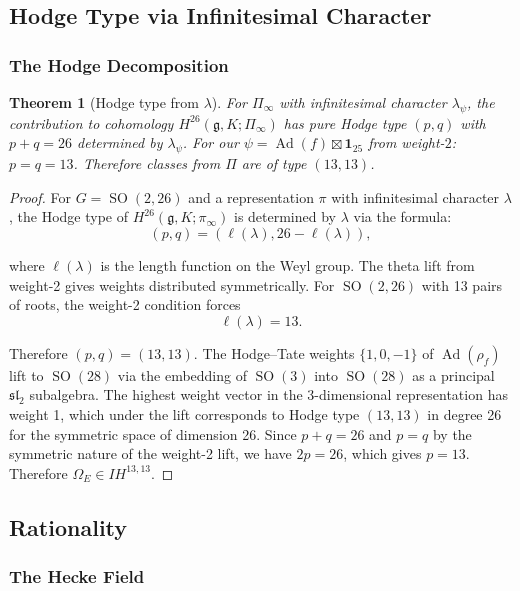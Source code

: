 \documentclass[12pt]{amsart}
\newtheorem{theorem}{Theorem}[section]
\theoremstyle{definition}
\DeclareMathOperator\SO{SO}
\DeclareMathOperator\Ad{Ad}
\newcommand{\IH}{\mathit{IH}}
\begin{document}
\subsection{Hodge Type via Infinitesimal Character}

\subsubsection{The Hodge Decomposition}

\begin{theorem}[Hodge type from $\lambda$]
For $\Pi_{\infty}$ with infinitesimal character $\lambda_{\psi}$, the contribution to cohomology $H^{26}({\mathfrak g}, K; \Pi_{\infty})$ has pure Hodge type $(p, q)$ with $p + q = 26$ determined by $\lambda_{\psi}$. For our $\psi = \Ad(f) \boxtimes \mathbf{1}_{25}$ from weight-$2$: $p = q = 13$. Therefore classes from $\Pi$ are of type $(13, 13)$.
\end{theorem}
\begin{proof}
 
For $G = \SO(2,26)$ and a representation $\pi$ with infinitesimal character $\lambda$, the Hodge type of $H^{26}(\mathfrak{g}, K; \pi_\infty)$ is determined by $\lambda$ via the formula:
$$(p, q) = (\ell(\lambda), 26 - \ell(\lambda)),$$

where $\ell(\lambda)$ is the length function on the Weyl group.
The theta lift from weight-2 gives weights distributed symmetrically. For $\SO(2,26)$ with 13 pairs of roots, the weight-2 condition forces
$$\ell(\lambda) = 13.$$

Therefore $(p, q) = (13, 13)$. The Hodge--Tate weights $\{1, 0, -1\}$ of $\Ad(\rho_f)$ lift to $\SO(28)$ via the embedding of $\SO(3)$ into $\SO(28)$ as a principal $\mathfrak{sl}_2$ subalgebra. The highest weight vector in the 3-dimensional representation has weight 1, which under the lift corresponds to Hodge type $(13,13)$ in degree 26 for the symmetric space of dimension 26. Since $p + q = 26$ and $p = q$ by the symmetric nature of the weight-2 lift, we have
$2p = 26$, which gives  $p = 13.$ Therefore $\Omega_E \in \IH^{13,13}$.
\end{proof}

\subsection{Rationality}

\subsubsection{The Hecke Field}
\end{document}
